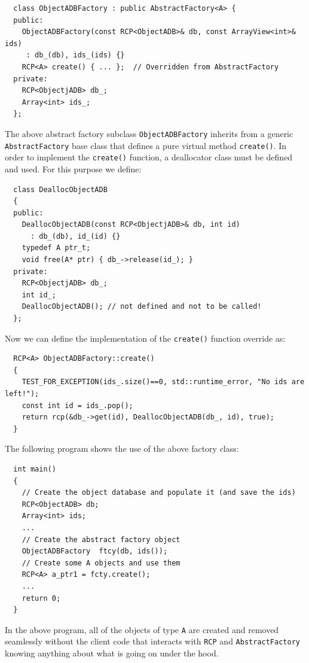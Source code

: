 \documentclass[pdf,ps2pdf,11pt]{SANDreport}
\begin{document}
{\small\begin{verbatim}
  class ObjectADBFactory : public AbstractFactory<A> {
  public:
    ObjectADBFactory(const RCP<ObjectADB>& db, const ArrayView<int>& ids)
     : db_(db), ids_(ids) {}
    RCP<A> create() { ... };  // Overridden from AbstractFactory
  private:
    RCP<ObjectjADB> db_;
    Array<int> ids_;
  };
\end{verbatim}}

The above abstract factory subclass {}\texttt{ObjectADBFactory}
inherits from a generic {}\texttt{AbstractFactory} base class that
defines a pure virtual method {}\texttt{create()}.  In order to
implement the {}\texttt{create()} function, a deallocator class must
be defined and used.  For this purpose we define:

{\small\begin{verbatim}
  class DeallocObjectADB
  {
  public:
    DeallocObjectADB(const RCP<ObjectjADB>& db, int id)
      : db_(db), id_(id) {}
    typedef A ptr_t;
    void free(A* ptr) { db_->release(id_); }
  private:
    RCP<ObjectjADB> db_;
    int id_;
    DeallocObjectADB(); // not defined and not to be called!
  };
\end{verbatim}}

Now we can define the implementation of the {}\texttt{create()}
function override as:

{\small\begin{verbatim}
  RCP<A> ObjectADBFactory::create()
  {
    TEST_FOR_EXCEPTION(ids_.size()==0, std::runtime_error, "No ids are left!");
    const int id = ids_.pop();
    return rcp(&db_->get(id), DeallocObjectADB(db_, id), true);
  }
\end{verbatim}}

The following program shows the use of the above factory class:

{\small\begin{verbatim}
  int main()
  {
    // Create the object database and populate it (and save the ids)
    RCP<ObjectADB> db;
    Array<int> ids;
    ...
    // Create the abstract factory object
    ObjectADBFactory  ftcy(db, ids());
    // Create some A objects and use them
    RCP<A> a_ptr1 = fcty.create();
    ...
    return 0;
  }
\end{verbatim}}

In the above program, all of the objects of type {}\texttt{A} are
created and removed seamlessly without the client code that interacts
with {}\texttt{RCP} and {}\texttt{AbstractFactory} knowing anything
about what is going on under the hood.
\end{document}
